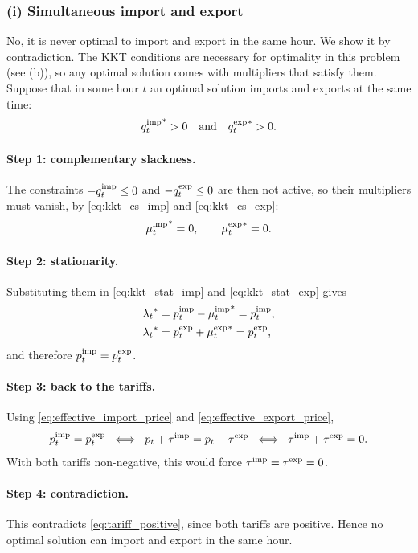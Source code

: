 \subsubsection{(i) Simultaneous import and export}
No, it is never optimal to import and export in the same hour. We show it by contradiction.
The KKT conditions are necessary for optimality in this problem (see (b)), so any optimal
solution comes with multipliers that satisfy them. Suppose that in some hour $t$ an optimal
solution imports and exports at the same time:
\begin{equation}
    {q^{\mathrm{imp}}_{t}}^* > 0 \quad \text{and} \quad {q^{\mathrm{exp}}_{t}}^* > 0.
\end{equation}

\paragraph{Step 1: complementary slackness.}
The constraints $-q^{\mathrm{imp}}_{t} \leq 0$ and $-q^{\mathrm{exp}}_{t} \leq 0$ are then not active, so their
multipliers must vanish, by \eqref{eq:kkt_cs_imp} and \eqref{eq:kkt_cs_exp}:
\begin{equation}
    {\mu^{\mathrm{imp}}_{t}}^* = 0, \qquad {\mu^{\mathrm{exp}}_{t}}^* = 0.
\end{equation}

\paragraph{Step 2: stationarity.}
Substituting them in \eqref{eq:kkt_stat_imp} and \eqref{eq:kkt_stat_exp} gives
\begin{align}
    {\lambda_{t}}^* &= p^{\mathrm{imp}}_{t} - {\mu^{\mathrm{imp}}_{t}}^* = p^{\mathrm{imp}}_{t}, \\
    {\lambda_{t}}^* &= p^{\mathrm{exp}}_{t} + {\mu^{\mathrm{exp}}_{t}}^* = p^{\mathrm{exp}}_{t},
\end{align}
and therefore $p^{\mathrm{imp}}_{t} = p^{\mathrm{exp}}_{t}$.

\paragraph{Step 3: back to the tariffs.}
Using \eqref{eq:effective_import_price} and \eqref{eq:effective_export_price},
\begin{equation}
    p^{\mathrm{imp}}_{t} = p^{\mathrm{exp}}_{t}
    \;\iff\; p_t + \tau^{\mathrm{imp}} = p_t - \tau^{\mathrm{exp}}
    \;\iff\; \tau^{\mathrm{imp}} + \tau^{\mathrm{exp}} = 0.
\end{equation}
With both tariffs non-negative, this would force $\tau^{\mathrm{imp}} = \tau^{\mathrm{exp}} = 0$.

\paragraph{Step 4: contradiction.}
This contradicts \eqref{eq:tariff_positive}, since both tariffs are positive. Hence no optimal
solution can import and export in the same hour.

